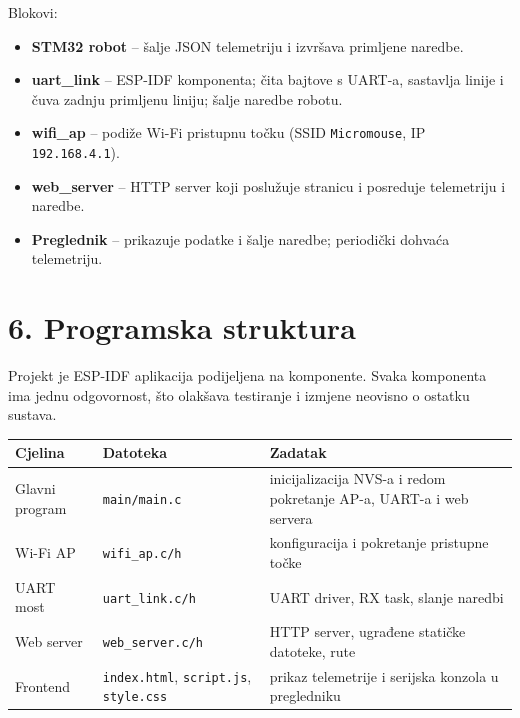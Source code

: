 \documentclass[10pt,a4paper]{article}
\begin{document}
Blokovi:
\begin{itemize}
	\item \textbf{STM32 robot} -- šalje JSON telemetriju i izvršava primljene naredbe.
	\item \textbf{uart\_link} -- ESP-IDF komponenta; čita bajtove s UART-a, sastavlja linije i čuva zadnju primljenu liniju; šalje naredbe robotu.
	\item \textbf{wifi\_ap} -- podiže Wi-Fi pristupnu točku (SSID \texttt{Micromouse}, IP \texttt{192.168.4.1}).
	\item \textbf{web\_server} -- HTTP server koji poslužuje stranicu i posreduje telemetriju i naredbe.
	\item \textbf{Preglednik} -- prikazuje podatke i šalje naredbe; periodički dohvaća telemetriju.
\end{itemize}

\section*{6. Programska struktura}

Projekt je ESP-IDF aplikacija podijeljena na komponente. Svaka komponenta ima jednu odgovornost, što olakšava testiranje i izmjene neovisno o ostatku sustava.

\begin{table}[h!]
	\centering
	\begin{tabular}{@{}llp{8cm}@{}}
		\toprule
		\textbf{Cjelina} & \textbf{Datoteka}                                           & \textbf{Zadatak}                                                    \\
		\midrule
		Glavni program   & \texttt{main/main.c}                                        & inicijalizacija NVS-a i redom pokretanje AP-a, UART-a i web servera \\
		Wi-Fi AP         & \texttt{wifi\_ap.c/h}                                       & konfiguracija i pokretanje pristupne točke                          \\
		UART most        & \texttt{uart\_link.c/h}                                     & UART driver, RX task, slanje naredbi                                \\
		Web server       & \texttt{web\_server.c/h}                                    & HTTP server, ugrađene statičke datoteke, rute                       \\
		Frontend         & \texttt{index.html}, \texttt{script.js}, \texttt{style.css} & prikaz telemetrije i serijska konzola u pregledniku                 \\
		\bottomrule
	\end{tabular}
\end{table}
\end{document}
